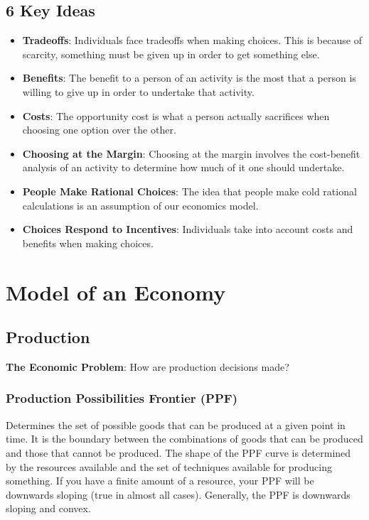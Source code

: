 \documentclass[letterpaper, 12pt]{article}
\begin{document}
\subsection{6 Key Ideas}
\begin{itemize}
  \item \textbf{Tradeoffs}: Individuals face tradeoffs when making choices.
  This is because of scarcity, something must be given up in order to get
  something else.
  \item \textbf{Benefits}: The benefit to a person of an activity is the most
  that a person is willing to give up in order to undertake that activity.
  \item \textbf{Costs}: The opportunity cost is what a person actually
  sacrifices when choosing one option over the other.
  \item \textbf{Choosing at the Margin}: Choosing at the margin involves
  the cost-benefit analysis of an activity to determine how much of it one
  should undertake.
  \item \textbf{People Make Rational Choices}: The idea that people make cold
  rational calculations is an assumption of our economics model.
  \item \textbf{Choices Respond to Incentives}: Individuals take into account
  costs and benefits when making choices.
\end{itemize}

\section{Model of an Economy}

\subsection{Production}
\textbf{The Economic Problem}: How are production decisions made?

\subsubsection{Production Possibilities Frontier (PPF)}
Determines the set of possible goods that can be produced at a given point in
time. It is the boundary between the combinations of goods that can be produced
and those that cannot be produced. The shape of the PPF curve is determined by
the resources available and the set of techniques available for producing
something. If you have a finite amount of a resource, your PPF will be
downwards sloping (true in almost all cases). Generally, the PPF is downwards
sloping and convex.
\end{document}
